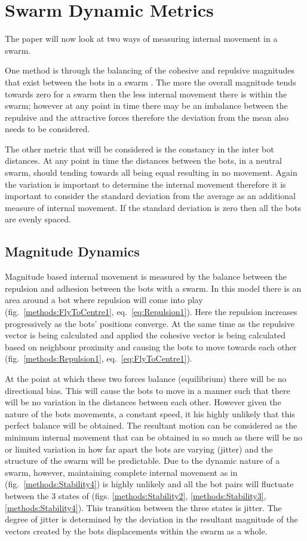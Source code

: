 \documentclass[10pt,journal,letterpaper,twoside]{IEEEtran}
\newcommand{\stability}{internal movement}
\newcommand{\Fig}{fig.}
\newcommand{\Figs}{figs.}
\newcommand{\Eq}{eq.}
\begin{document}
\section{Swarm Dynamic Metrics\label{methods:SwarmStability}}
The paper will now look at two ways of measuring \stability{} in a swarm.

One method is through the balancing of the cohesive and repulsive magnitudes that exist between the bots in a swarm \cite{VGKP11} \cite{LBMFKV07}. The more the overall magnitude tends towards zero for a swarm then the less \stability{} there is within the swarm; however at any point in time there may be an imbalance between the repulsive and the attractive forces therefore the deviation from the mean also needs to be considered.

The other metric that will be considered is the constancy in the inter bot distances. At any point in time the distances between the bots, in a neutral swarm, should tending towards all being equal resulting in no movement. Again the variation is important to determine the \stability{} therefore it is important to consider the standard deviation from the average as an additional measure of \stability{}. If the standard deviation is zero then all the bots are evenly spaced.

\subsection{Magnitude Dynamics}

Magnitude based \stability{} is measured by the balance between the repulsion and adhesion between the bots with a swarm. In this model there is an area around a bot where repulsion will come into play (\Fig{}~\ref{methods:FlyToCentre1}, \Eq{}~\ref{eq:Repulsion1}).
Here the repulsion increases progressively as the bots' positions converge. At the same time as the repulsive vector is being calculated and applied the cohesive vector is being calculated based on neighbour proximity and causing the bots to move towards each other (\Fig{}~\ref{methods:Repulsion1}, \Eq{}~\ref{eq:FlyToCentre1}).

At the point at which these two forces balance (equilibrium) there will be no directional bias. This will cause the bots to move in a manner such that there will be no variation in the distances between each other. However given the nature of the bots movements, a constant speed, it his highly unlikely that this perfect balance will be obtained. The resultant motion can be considered as the minimum \stability{} that can be obtained in so much as there will be no or limited variation in how far apart the bots are varying (jitter) and the structure of the swarm will be predictable. Due to the dynamic nature of a swarm, however, maintaining complete \stability{} as in (\Fig{}~\ref{methods:Stability4}) is highly unlikely and all the bot pairs will fluctuate between the 3 states of (\Figs{} \ref{methods:Stability2}, \ref{methods:Stability3}, \ref{methods:Stability4}).
This transition between the three states is jitter. The degree of jitter is determined by the deviation in the resultant magnitude of the vectors created by the bots displacements within the swarm as a whole.
\end{document}
